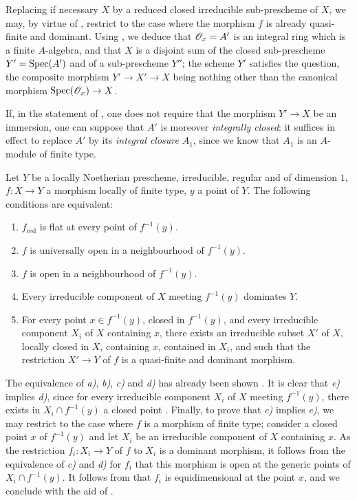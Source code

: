 Replacing if necessary $X$ by a reduced closed irreducible sub-prescheme of $X$, we may, by virtue of , restrict to the case where the morphism $f$ is already quasi-finite and dominant.
Using , we deduce that $\mathscr{O}_x=A'$ is an integral ring which is a finite $A$-algebra, and that $X$ is a disjoint sum of the closed sub-prescheme $Y'=\operatorname{Spec}(A')$ and of a sub-prescheme $Y''$; the scheme $Y'$ satisfies the question, the composite morphism $Y'\to X'\to X$ being nothing other than the canonical morphism $\operatorname{Spec}(\mathscr{O}_x)\to X$.

\begin{remark}[14.5.5]
\label{IV.14.5.5}
If, in the statement of , one does not require that the morphism $Y'\to X$ be an immersion, one can suppose that $A'$ is moreover \emph{integrally closed}: it suffices in effect to replace $A'$ by its \emph{integral closure} $A_1$, since we know  that $A_1$ is an $A$-module of finite type.
\end{remark}

\begin{proposition}[14.5.6]
\label{IV.14.5.6}
Let $Y$ be a locally Noetherian prescheme, irreducible, regular and of dimension $1$, $f:X\to Y$ a morphism locally of finite type, $y$ a point of $Y$.
The following conditions are equivalent:
\begin{enumerate}[label=\emph{\alph*)}]
  \item $f_{\mathrm{red}}$ is flat at every point of $f^{-1}(y)$.
  \item $f$ is universally open in a neighbourhood of $f^{-1}(y)$.
  \item $f$ is open in a neighbourhood of $f^{-1}(y)$.
  \item Every irreducible component of $X$ meeting $f^{-1}(y)$ dominates $Y$.
  \item For every point $x\in f^{-1}(y)$, closed in $f^{-1}(y)$, and every irreducible component $X_i$ of $X$ containing $x$, there exists an irreducible subset $X'$ of $X$, locally closed in $X$, containing $x$, contained in $X_i$, and such that the restriction $X'\to Y$ of $f$ is a quasi-finite and dominant morphism.
\end{enumerate}
\end{proposition}

The equivalence of \emph{a)}, \emph{b)}, \emph{c)} and \emph{d)} has already been shown .
It is clear that \emph{e)} implies \emph{d)}, since for every irreducible component $X_i$ of $X$ meeting $f^{-1}(y)$, there exists in $X_i\cap f^{-1}(y)$ a closed point .
Finally, to prove that \emph{c)} implies \emph{e)}, we may restrict to the case where $f$ is a morphism of finite type; consider a closed point $x$ of $f^{-1}(y)$ and let $X_i$ be an irreducible component of $X$ containing $x$.
As the restriction $f_i:X_i\to Y$ of $f$ to $X_i$ is a dominant morphism, it follows from the equivalence of \emph{c)} and \emph{d)} for $f_i$ that this morphism is open at the generic points of $X_i\cap f^{-1}(y)$. It follows from  that $f_i$ is equidimensional at the point $x$, and we conclude with the aid of .

